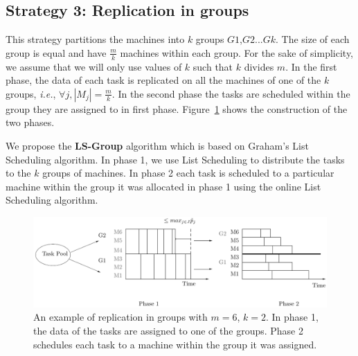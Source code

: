 \documentclass[twocolumn]{svjour3}
\begin{document}
\subsection{Strategy 3: Replication in groups}\label{sec6}
\label{sec:rbm-groups}

This strategy partitions the machines into $k$ groups
$G1$,$G2$...$Gk$. The size of each group is equal and have
$\frac{m}{k}$ machines within each group. For the sake of
simplicity, we assume that we will only use values of $k$ such that
$k$ divides $m$. In the first phase, the data of each task is
replicated on all the machines of one of the $k$ groups,
{\em i.e.}, $\forall j, |M_j|= \frac{m}{k}$. In the second phase the tasks
are scheduled within the group they are assigned to in first phase.
Figure~\ref{fig:Model 3} shows the construction of the two phases.

We propose the \textbf{LS-Group} algorithm which is based on Graham's
List Scheduling algorithm. In phase 1, we use List Scheduling to
distribute the tasks to the $k$ groups of machines. In phase 2 each
task is scheduled to a particular machine within the group it was
allocated in phase 1 using the online List Scheduling algorithm.

\begin{figure}[htp] 
\centering
\includegraphics[width=\linewidth]{model3.pdf}
\caption{An example of replication in groups with $m = 6$, $k = 2$. In
  phase 1, the data of the tasks are assigned to one of the
  groups. Phase 2 schedules each task to a machine within the group it was 
  assigned.}
\label{fig:Model 3}
\end{figure}
\end{document}
